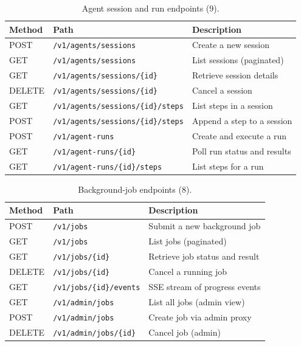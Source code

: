 \documentclass[a4paper]{sapthesis}
\begin{document}
\begin{table}[ht]
\centering
\caption{Agent session and run endpoints (9).}
\label{tab:app-agent-ep}
\small
\begin{tabularx}{\textwidth}{@{}l l X@{}}
    \hline
    \textbf{Method} & \textbf{Path} & \textbf{Description} \\
    \hline
    POST   & \texttt{/v1/agents/sessions}               & Create a new session \\
    GET    & \texttt{/v1/agents/sessions}               & List sessions (paginated) \\
    GET    & \texttt{/v1/agents/sessions/\{id\}}        & Retrieve session details \\
    DELETE & \texttt{/v1/agents/sessions/\{id\}}        & Cancel a session \\
    GET    & \texttt{/v1/agents/sessions/\{id\}/steps}  & List steps in a session \\
    POST   & \texttt{/v1/agents/sessions/\{id\}/steps}  & Append a step to a session \\
    POST   & \texttt{/v1/agent-runs}                    & Create and execute a run \\
    GET    & \texttt{/v1/agent-runs/\{id\}}             & Poll run status and results \\
    GET    & \texttt{/v1/agent-runs/\{id\}/steps}       & List steps for a run \\
    \hline
\end{tabularx}
\end{table}

\begin{table}[ht]
\centering
\caption{Background-job endpoints (8).}
\label{tab:app-job-ep}
\small
\begin{tabularx}{\textwidth}{@{}l l X@{}}
    \hline
    \textbf{Method} & \textbf{Path} & \textbf{Description} \\
    \hline
    POST   & \texttt{/v1/jobs}               & Submit a new background job \\
    GET    & \texttt{/v1/jobs}               & List jobs (paginated) \\
    GET    & \texttt{/v1/jobs/\{id\}}        & Retrieve job status and result \\
    DELETE & \texttt{/v1/jobs/\{id\}}        & Cancel a running job \\
    GET    & \texttt{/v1/jobs/\{id\}/events} & SSE stream of progress events \\
    \hline
    GET    & \texttt{/v1/admin/jobs}           & List all jobs (admin view) \\
    POST   & \texttt{/v1/admin/jobs}           & Create job via admin proxy \\
    DELETE & \texttt{/v1/admin/jobs/\{id\}}  & Cancel job (admin) \\
    \hline
\end{tabularx}
\end{table}
\end{document}
